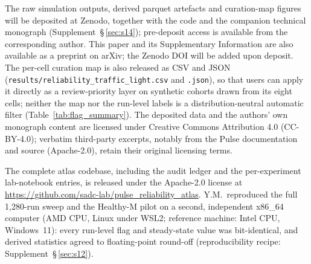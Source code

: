 \documentclass[pdflatex,sn-nature]{sn-jnl}%
\begin{document}

\hypertarget{tgt:data-avail}{}

\noindent The raw simulation outputs, derived parquet artefacts and curation-map figures will be deposited at Zenodo, together with the code and the companion technical monograph (Supplement~\S\,\ref{sec:s14}); pre-deposit access is available from the corresponding author. This paper and its Supplementary Information are also available as a preprint on arXiv; the Zenodo DOI will be added upon deposit. The per-cell curation map is also released as CSV and JSON (\texttt{results/reliability\_traffic\_light.csv} and \texttt{.json}), so that users can apply it directly as a review-priority layer on synthetic cohorts drawn from its eight cells; neither the map nor the run-level labels is a distribution-neutral automatic filter (Table~\ref{tab:flag_summary}). The deposited data and the authors' own monograph content are licensed under Creative Commons Attribution 4.0 (CC-BY-4.0); verbatim third-party excerpts, notably from the Pulse documentation and source (Apache-2.0), retain their original licensing terms.

\hypertarget{tgt:code-avail}{}

\noindent The complete atlas codebase, including the audit ledger and the per-experiment lab-notebook entries, is released under the Apache-2.0 license at \url{https://github.com/sadc-lab/pulse_reliability_atlas}. Y.M.\ reproduced the full 1{,}280-run sweep and the Healthy-M pilot on a second, independent x86\_64 computer (AMD CPU, Linux under WSL2; reference machine: Intel CPU, Windows~11): every run-level flag and steady-state value was bit-identical, and derived statistics agreed to floating-point round-off (reproducibility recipe: Supplement~\S\,\ref{sec:s12}).

\end{document}
